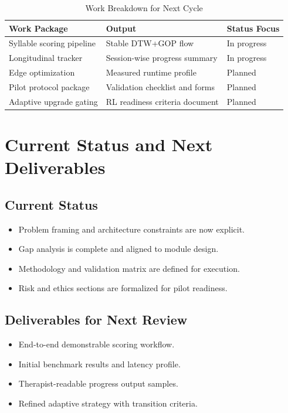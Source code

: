 \documentclass[12pt,a4paper]{article}
\begin{document}
\begin{table}[H]
\centering
\caption{Work Breakdown for Next Cycle}
\renewcommand{\arraystretch}{1.25}
\begin{tabularx}{\textwidth}{|p{4cm}|L|p{2.8cm}|}
\hline
\textbf{Work Package} & \textbf{Output} & \textbf{Status Focus} \\
\hline
Syllable scoring pipeline & Stable DTW+GOP flow & In progress \\
\hline
Longitudinal tracker & Session-wise progress summary & In progress \\
\hline
Edge optimization & Measured runtime profile & Planned \\
\hline
Pilot protocol package & Validation checklist and forms & Planned \\
\hline
Adaptive upgrade gating & RL readiness criteria document & Planned \\
\hline
\end{tabularx}
\end{table}

\section{Current Status and Next Deliverables}
\subsection{Current Status}
\begin{itemize}[noitemsep,topsep=2pt]
\item Problem framing and architecture constraints are now explicit.
\item Gap analysis is complete and aligned to module design.
\item Methodology and validation matrix are defined for execution.
\item Risk and ethics sections are formalized for pilot readiness.
\end{itemize}

\subsection{Deliverables for Next Review}
\begin{itemize}[noitemsep,topsep=2pt]
\item End-to-end demonstrable scoring workflow.
\item Initial benchmark results and latency profile.
\item Therapist-readable progress output samples.
\item Refined adaptive strategy with transition criteria.
\end{itemize}
\end{document}
